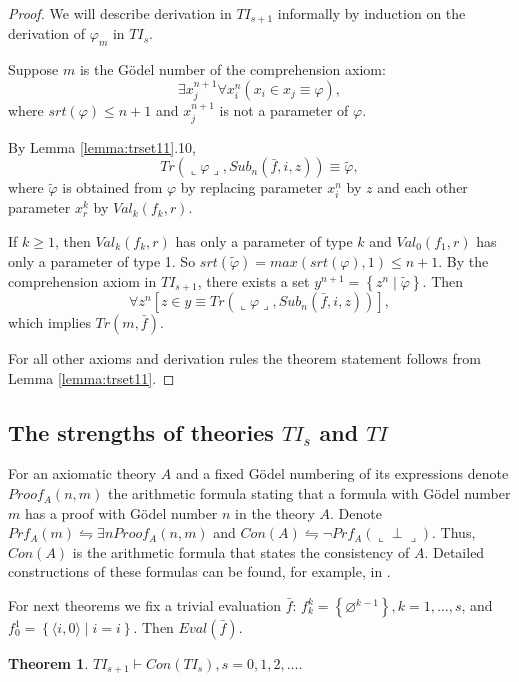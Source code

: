 \documentclass{asl}
\newtheorem{theorem}{Theorem}[section]
\theoremstyle{definition}
\begin{document}
\begin{proof}
We will describe derivation in $TI_{s+1}$ informally by induction on the derivation of $\varphi_m$ in $TI_s$.

Suppose $m$ is the G\"{o}del number of the comprehension axiom:
\[\exists x_j^{n+1} \forall x_i^n \left(x_i\in x_j\equiv \varphi \right),\]
where $srt(\varphi)\leqslant n+1$ and $x_j^{n+1}$ is not a parameter of $\varphi$.

By Lemma \ref{lemma:trset11}.10, 
\[Tr(\llcorner \varphi\lrcorner,Sub_n(\bar{f},i,z))\equiv \tilde{\varphi},\] 
where $\tilde{\varphi}$ is obtained from $\varphi$ by replacing parameter $x_i^n$ by $z$ and each other parameter $x_r^k$ by $Val_k(f_k,r)$. 

If $k\geqslant 1$, then $Val_k(f_k,r)$ has only a parameter of type $k$ and $Val_0(f_1,r)$ has only a parameter of type 1. So $srt(\tilde{\varphi})= max(srt(\varphi),1) \leqslant n+1$. 
By the comprehension axiom in $TI_{s+1}$, there exists a set $y^{n+1}=\left\lbrace z^n \mid \tilde{\varphi}\right\rbrace$. Then 
\[\forall z^n \left[z\in y \equiv Tr(\llcorner  \varphi\lrcorner, Sub_n(\bar{f},i,z))\right],\]
which implies $Tr(m,\bar{f})$.

For all other axioms and derivation rules the theorem statement follows from Lemma \ref{lemma:trset11}.
\end{proof}

\subsection{The strengths of theories $TI_s$ and $TI$}
For an axiomatic theory $A$ and a fixed G\"{o}del numbering of its expressions denote $Proof_A(n,m)$ the arithmetic formula stating that a formula with G\"{o}del number $m$ has a proof with G\"{o}del number $n$ in the theory $A$. 
Denote $Prf_A(m)\leftrightharpoons \exists n Proof_A(n,m)$ and $Con(A)\leftrightharpoons\neg  Prf_A(\llcorner \perp \lrcorner)$. Thus, $Con(A)$ is the arithmetic formula that states the consistency of $A$. Detailed constructions of these formulas can be found, for example, in \cite{mend09}. 

For next theorems we fix a trivial evaluation $\bar{f}$: $f^k_k = \left\lbrace \varnothing^{k-1}\right\rbrace , k=1,\ldots,s$, and $f^1_0=\left\lbrace \langle i,0 \rangle \mid i=i\right\rbrace $. Then $Eval(\bar{f})$.

\begin{theorem}
$TI_{s+1}\vdash Con(TI_s), s=0,1,2,\ldots$.
\label{theorem:con1}
\end{theorem}
\end{document}
